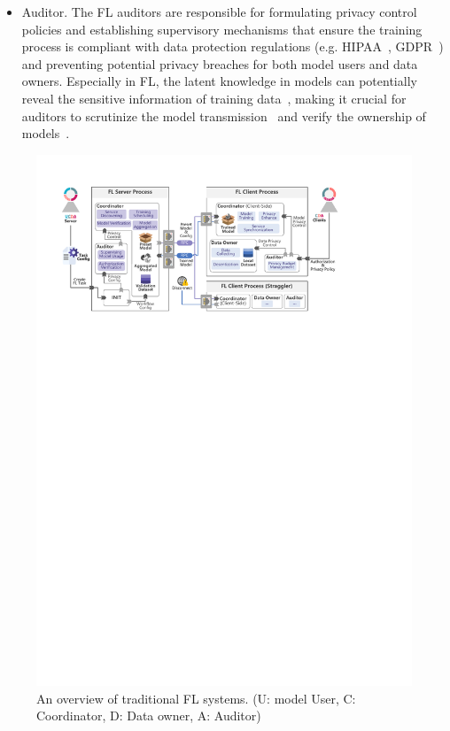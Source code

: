 \begin{itemize}
    \item Auditor. The FL auditors are responsible for formulating privacy control policies and establishing supervisory mechanisms that ensure the training process is compliant with data protection regulations (e.g. HIPAA~\cite{act1996health}, GDPR~\cite{voigt2017eu}) and preventing potential privacy breaches for both model users and data owners. Especially in FL, the latent knowledge in models can potentially reveal the sensitive information of training data~\cite{wang2019beyond, zhu2019deep, jin2021cafe}, making it crucial for auditors to scrutinize the model transmission~\cite{wei2021gradient, li2022auditing} and verify the ownership of models~\cite{tekgul2021waffle, shao2022fedtracker}.
\end{itemize}

\begin{figure}[t]
    \centering
    \includegraphics[width=\linewidth]{fig/fl_frame.pdf}
    \caption{An overview of traditional FL systems. (U: model User, C: Coordinator, D: Data owner, A: Auditor)}
    \Description{}
    \label{fig:fl}
  \end{figure}

